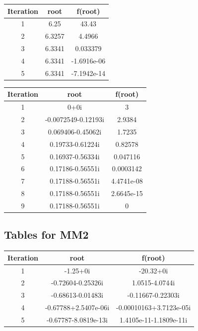 \documentclass[12pt]{report}
\begin{document}
\begin{center}
  \begin{tabular}{| c  c c |}
\hline
Iteration & root         & f(root) \\
\hline
1   &     6.25   &        43.43 \\
\hline
2   &   6.3257   &       4.4966 \\
\hline
3   &  6.3341    &   0.033379 \\
\hline
4   &   6.3341   &  -1.6916e-06 \\
\hline
5   &   6.3341   &  -7.1942e-14 \\
\hline

\hline

\end{tabular}
\end{center}

\begin{center}
  \begin{tabular}{| c  c c |}
\hline
Iteration & root         & f(root) \\
\hline
1   &            0+0i         &             3   \\
\hline
2   &  -0.0072549-0.12193i    &       2.9384   \\
\hline
3   &     0.069406-0.45062i   &       1.7235  \\
\hline
4   &      0.19733-0.61224i   &      0.82578   \\
\hline
5   &     0.16937-0.56334i    &     0.047116   \\
\hline
6   &      0.17186-0.56551i   &     0.0003142   \\
\hline
7   &      0.17188-0.56551i   &    4.4741e-08  \\
\hline
8   &      0.17188-0.56551i   &    2.6645e-15    \\
\hline
9   &      0.17188-0.56551i   &             0   \\
\hline
\hline

\end{tabular}
\end{center}

\subsection{Tables for MM2}
\begin{center}
  \begin{tabular}{| c  c c |}
\hline
Iteration & root         & f(root) \\
\hline
1  &       -1.25+0i         &         -20.32+0i    \\
\hline
2  &    -0.72604-0.25326i   &         1.0515-4.0744i  \\
\hline
3  &   -0.68613-0.01483i    &      -0.11667-0.22303i   \\
\hline
4  &   -0.67788+2.5407e-06i &   -0.00010163+3.7123e-05i \\
\hline
5  &    -0.67787-8.0819e-13i &    1.4105e-11-1.1809e-11i \\
\hline
 \hline

\end{tabular}
\end{center}
\end{document}
